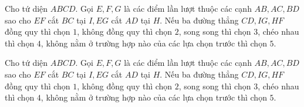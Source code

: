 \begin{bt}%
	Cho tứ diện $ ABCD$. Gọi $ E,F,G$ là các điểm lần lượt thuộc các cạnh $ AB,AC,BD$ sao cho $ EF$ cắt $ BC$ tại $ I,EG$ cắt $ AD$ tại $ H$. Nếu ba đường thẳng $ CD, IG, HF$  đồng quy thì chọn $1$, không đồng quy thì chọn $2$, song song thì chọn $3$, chéo nhau thì chọn $4$, không nằm ở trường hợp nào của các lựa chọn trước thì chọn $5$.
\end{bt}

\begin{ex}%
	Cho tứ diện $ ABCD$. Gọi $ E,F,G$ là các điểm lần lượt thuộc các cạnh $ AB,AC,BD$ sao cho $ EF$ cắt $ BC$ tại $ I,EG$ cắt $ AD$ tại $ H$. Nếu ba đường thẳng $ CD, IG, HF$ đồng quy thì chọn $1$, không đồng quy thì chọn $2$, song song thì chọn $3$, chéo nhau thì chọn $4$, không nằm ở trường hợp nào của các lựa chọn trước thì chọn  $5$.
\end{ex}

